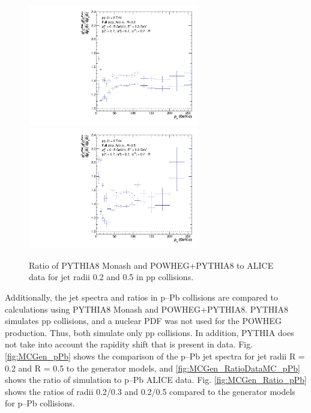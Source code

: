 \documentclass[ALICE]{ALICE_analysis_notes}
\newcommand{\pPb}{{\mbox{p--Pb}}\xspace}
\newcommand{\pp}{pp\xspace}
\begin{document}
\begin{figure}
    \centering
    \begin{multicols}{2}
            \includegraphics[width=7.5cm]{figures/MCGen/ratioDataMC/ratio_simdata_R02_nooutlier.pdf}
        \vfill\null
        \columnbreak
            \includegraphics[width=7.5cm]{figures/MCGen/ratioDataMC/ratio_simdata_R05_nooutlier.pdf}
        \vfill\null
    \end{multicols}
    \caption{Ratio of PYTHIA8 Monash and POWHEG+PYTHIA8 to ALICE data for jet radii 0.2 and 0.5 in \pp collisions.}
    \label{fig:MCGen_RatioDataMC}
\end{figure}

Additionally, the jet spectra and ratios in \pPb collisions are compared to calculations using PYTHIA8 Monash and POWHEG+PYTHIA8. PYTHIA8 simulates \pp collisions, and a nuclear PDF was not used for the POWHEG production. Thus, both simulate only \pp collisions. In addition, PYTHIA does not take into account the rapidity shift that is present in data. Fig. \ref{fig:MCGen_pPb} shows the comparison of the \pPb jet spectra for jet radii R = 0.2 and R = 0.5 to the generator models, and \ref{fig:MCGen_RatioDataMC_pPb} shows the ratio of simulation to \pPb ALICE data. Fig. \ref{fig:MCGen_Ratio_pPb} shows the ratios of radii 0.2/0.3 and 0.2/0.5 compared to the generator models for \pPb collisions. 
\end{document}
